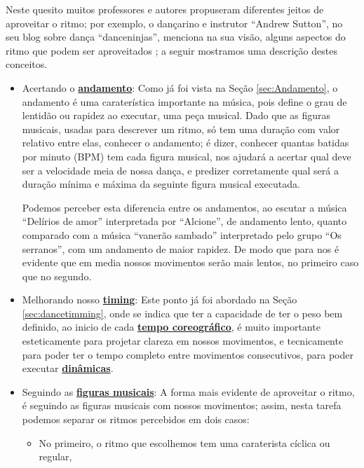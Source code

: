 Neste quesito muitos professores e autores propuseram diferentes jeitos de aproveitar o ritmo; 
por exemplo, o dançarino e instrutor ``Andrew Sutton'', 
no seu blog sobre dança ``danceninjas'',
menciona na sua visão, alguns aspectos do ritmo que podem ser aproveitados \cite{AndrewSuttonRitmo1};
a seguir mostramos uma descrição destes conceitos.  
\begin{itemize}
\item Acertando o \hyperref[sec:Andamento]{\textbf{andamento}}:
Como já foi vista na Seção \ref{sec:Andamento},
o andamento é uma caraterística importante na música,
pois define o grau de lentidão ou rapidez ao executar,
uma peça musical. 
Dado que as figuras musicais, usadas para descrever um ritmo, 
só tem uma duração com valor relativo entre elas,
conhecer o andamento; é dizer, conhecer quantas batidas por minuto (BPM) tem cada figura musical,
nos ajudará a acertar qual deve ser a velocidade meia de nossa dança,
e predizer corretamente qual será a duração mínima e máxima da seguinte figura musical executada.
\begin{example}
Podemos perceber esta diferencia entre os andamentos, 
ao escutar a música ``Delírios de amor'' interpretada por ``Alcione'', 
de andamento lento, 
quanto comparado com a música ``vanerão sambado'' interpretado pelo grupo ``Os serranos'', 
com um andamento de maior rapidez.
De modo que para nos é evidente que em media nossos movimentos serão mais lentos,
no primeiro caso que no segundo.
\end{example}
\item Melhorando nosso \hyperref[sec:dancetimming]{\textbf{timing}}:
Este ponto já foi abordado na Seção \ref{sec:dancetimming},
onde se indica que ter a capacidade de ter o peso bem definido,
ao inicio de cada \hyperref[sec:TemposCoreograficos]{\textbf{tempo coreográfico}}, 
é muito importante esteticamente para projetar clareza em nossos movimentos,
e tecnicamente para poder ter o tempo completo entre movimentos consecutivos,
para poder executar \hyperref[sec:musicalidade:dinamicas]{\textbf{dinâmicas}}.
\item Seguindo as \hyperref[sec:figurasmusicais]{\textbf{figuras musicais}}:
A forma mais evidente de aproveitar o ritmo, 
é seguindo as figuras musicais com nossos movimentos;
assim, nesta tarefa podemos separar os ritmos percebidos em dois casos:
\begin{itemize} 
\item No primeiro, o ritmo que escolhemos tem uma caraterista cíclica ou regular,

\end{itemize}
\end{itemize}
